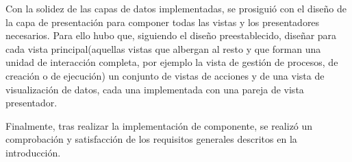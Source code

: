 \vspace{5mm} 


Con la solidez de las capas de datos implementadas, se prosiguió con el diseño de la capa de presentación para componer todas las vistas y los presentadores necesarios. Para ello hubo que, siguiendo el diseño preestablecido, diseñar para cada vista principal(aquellas vistas que albergan al resto y que forman una unidad de interacción completa, por ejemplo la vista de gestión de procesos, de creación o de ejecución) un conjunto de vistas de acciones y de una vista de visualización de datos, cada una implementada con una pareja de vista presentador.

\vspace{5mm} 

Finalmente, tras realizar la implementación de componente, se realizó un comprobación y satisfacción de los requisitos generales descritos en la introducción.


